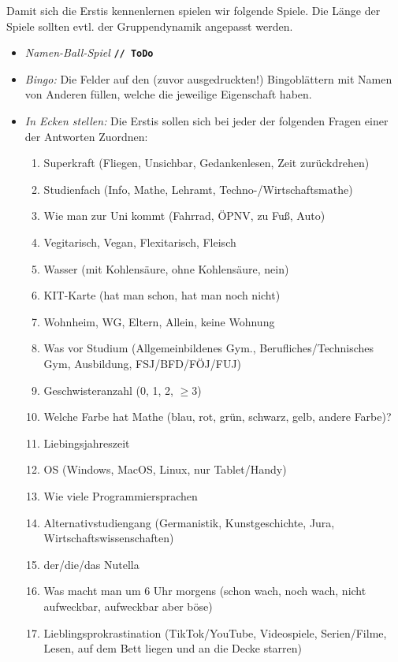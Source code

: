 \documentclass[10pt,twocolumn,ngerman]{scrartcl}
\begin{document}
Damit sich die Erstis kennenlernen spielen wir folgende Spiele. Die Länge der
Spiele sollten evtl. der Gruppendynamik angepasst werden.
\begin{itemize}
    \item \emph{Namen-Ball-Spiel} \textbf{\texttt{// ToDo}}
        
    \item \emph{Bingo:} Die Felder auf den (zuvor ausgedruckten!) Bingoblättern mit Namen von Anderen füllen, welche die jeweilige Eigenschaft haben.

    \item \emph{In Ecken stellen:} Die Erstis sollen sich bei jeder der
        folgenden Fragen einer der Antworten Zuordnen:
        \begin{enumerate}
            \item Superkraft (Fliegen, Unsichbar, Gedankenlesen, Zeit zurückdrehen)
            \item Studienfach (Info, Mathe, Lehramt, Techno-/Wirtschaftsmathe)
            \item Wie man zur Uni kommt (Fahrrad, ÖPNV, zu Fuß, Auto)
            \item Vegitarisch, Vegan, Flexitarisch, Fleisch
            \item Wasser (mit Kohlensäure, ohne Kohlensäure, nein)
            \item KIT-Karte (hat man schon, hat man noch nicht)
            \item Wohnheim, WG, Eltern, Allein, keine Wohnung
            \item Was vor Studium (Allgemeinbildenes Gym., Berufliches/Technisches Gym, Ausbildung, FSJ/BFD/FÖJ/FUJ)
            \item Geschwisteranzahl (0, 1, 2, $\geq 3$)
            \item Welche Farbe hat Mathe (blau, rot, grün, schwarz, gelb, andere Farbe)?
            \item Liebingsjahreszeit
            \item OS (Windows, MacOS, Linux, nur Tablet/Handy)
            \item Wie viele Programmiersprachen
            \item Alternativstudiengang (Germanistik, Kunstgeschichte, Jura, Wirtschaftswissenschaften)
            \item der/die/das Nutella
            \item Was macht man um 6 Uhr morgens (schon wach, noch wach, nicht aufweckbar, aufweckbar aber böse)
            \item Lieblingsprokrastination (TikTok/YouTube, Videospiele, Serien/Filme, Lesen, auf dem Bett liegen und an die Decke starren)
        \end{enumerate}


\end{itemize}
\end{document}
